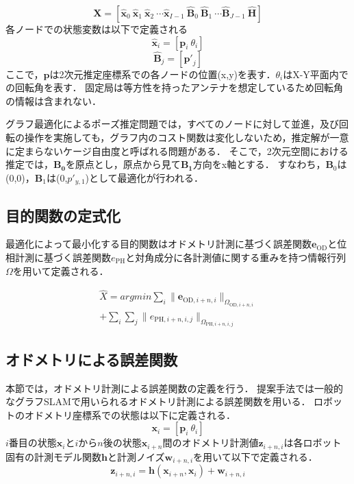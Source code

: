 \documentclass[a4jsme]{jsmepaper}
\begin{document}
\begin{equation}
    \mathbf{X} = \left[\mathbf{\hat{x}}_0 \ \mathbf{\hat{x}}_1 \  \mathbf{\hat{x}}_2 \ \cdots \mathbf{\hat{x}}_{I-1} \  \mathbf{\hat{B}}_0 \ \mathbf{\hat{B}}_1 \ \cdots \mathbf{\hat{B}}_{J-1} \  \mathbf{\hat{H}} \right]
\end{equation}
各ノードでの状態変数は以下で定義される
\begin{equation}
   \mathbf{\hat{x}}_i = \left[\mathbf{p}_i \ \theta_{i}\right]
\end{equation}
\begin{equation}
   \mathbf{\hat{B}}_j = \left[\mathbf{p'}_j\right]
\end{equation}
ここで，$\mathbf{p}$は2次元推定座標系での各ノードの位置(x,y)を表す．$\theta_{i}$はX-Y平面内での回転角を表す．
固定局は等方性を持ったアンテナを想定しているため回転角の情報は含まれない．

グラフ最適化によるポーズ推定問題では，すべてのノードに対して並進，及び回転の操作を実施しても，グラフ内のコスト関数は変化しないため，推定解が一意に定まらないケージ自由度と呼ばれる問題がある．
そこで，2次元空間における推定では，$\mathbf{B_0}$を原点とし，原点から見て$\mathbf{B_1}$方向をx軸とする．
すなわち，$\mathbf{B}_0$は(0,0)，$\mathbf{B}_1$は(0,$p'_{y,1}$)として最適化が行われる．

\subsection{目的関数の定式化}
最適化によって最小化する目的関数はオドメトリ計測に基づく誤差関数$\mathbf{e}_{\mathrm{OD}}$と位相計測に基づく誤差関数$e_{\mathrm{PH}}$と対角成分に各計測値に関する重みを持つ情報行列$\Omega$を用いて定義される．

\begin{align}
    \hat{X} = argmin\sum_{i}\|\mathbf{e}_{\mathrm{OD},i+n,i}\|_{\Omega_{\mathrm{OD},i+n,i}} \\
    +\sum_{i}\sum_{j}\|e_{\mathrm{PH},i+n,i,j}\|_{\Omega_{\mathrm{PH},i+n,i,j}}
\end{align}

\subsection{オドメトリによる誤差関数}
本節では，オドメトリ計測による誤差関数の定義を行う．
提案手法では一般的なグラフSLAM\cite{graph_slam}で用いられるオドメトリ計測による誤差関数を用いる．
ロボットのオドメトリ座標系での状態は以下に定義される．
\begin{equation}
    \mathbf{x}_i = [\mathbf{p}_i \ \theta_i]
\end{equation}
$i$番目の状態$\mathbf{x}_i$と$i$から$n$後の状態$\mathbf{x}_{i+n}$間のオドメトリ計測値$\mathbf{z}_{i+n,i}$は各ロボット固有の計測モデル関数$\mathbf{h}$と計測ノイズ$\mathbf{w}_{i+n,i}$を用いて以下で定義される．
\begin{equation}
    \mathbf{z}_{i+n,i} = \mathbf{h}(\mathbf{x}_{i+n},\mathbf{x}_{i})+\mathbf{w}_{i+n,i}
\end{equation}
\end{document}
